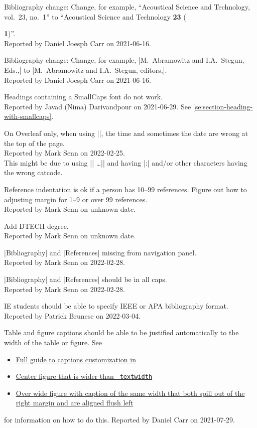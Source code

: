 Bibliography change:
Change,
for example,
``Acoustical Science and Technology, vol.~23, no.~1''
to
``Acoustical Science and Technology {\textbf{23}} ({\textbf{1})''.\\
Reported by Daniel Joesph Carr on 2021-06-16.

Bibliography change:
Change,
for example,
|M.~Abramowitz and I.A.~Stegun, Eds.,|
to
|M.~Abramowitz and I.A.~Stegun, editors,|.\\
Reported by Daniel Joesph Carr on 2021-06-16.

Headings containing a SmallCaps font do not work.\\
Reported by Javad (Nima) Darivandpour on 2021-06-29.
See \ref{se:section-heading-with-smallcaps}.

On Overleaf only,
when using
|\def\ZZshowtimestamp{true}|,
the time and sometimes the date
are wrong at the top of the page.\\
Reported by Mark Senn on 2022-02-25.\\
This might be due to using
|\ExplSyntaxOn| \ldots |\ExplSyntaxOff|
and having |:| and/or other characters having the wrong catcode.

Reference indentation is ok if a person has 10--99 references.
Figure out how to adjusting margin for 1--9 or over 99 references.\\
Reported by Mark Senn on unknown date.

Add DTECH degree.\\
Reported by Mark Senn on unknown date.

|Bibliography| and |References| missing from navigation panel.\\
Reported by Mark Senn on 2022-02-28.

|Bibliography| and |References| should be in all caps.\\
Reported by Mark Senn on 2022-02-28.

IE students should be able
to specify IEEE
or APA bibliography format.\\
Reported by Patrick Brunese on 2022-03-04.

Table and figure captions
should be able to be justified automatically
to the width of the table or figure.
See
\begin{itemize}
\item
\href{https://latex-tutorial.com/caption-customization-latex}%
{Full guide to captions customization in \LaTeXLogo}
\item
\href{https://tex.stackexchange.com/questions/16582/center-figure-that-is-wider-than-textwidth/16584\#16584}%
{Center figure that is wider than {\tt {} textwidth}}
\item
\href{https://tex.stackexchange.com/questions/98971/over-wide-figure-with-caption-of-the-same-width-that-both-spill-out-of-the-right}%
{Over wide figure with caption of the same width that both spill out of the right margin and are aligned flush left}
\end{itemize}
for information on how to do this.
Reported by Daniel Carr on 2021-07-29.

}
